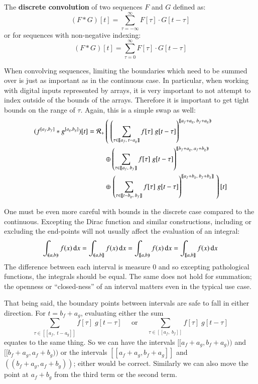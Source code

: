 \begin{definition}
	The \textbf{discrete convolution} of two sequences $F$ and $G$ defined as:
	\begin{equation}
		(F*G)[t] = \sum_{\tau=-\infty}^\infty F[\tau] \cdot G[t-\tau]
	\end{equation}
	or for sequences with non-negative indexing:
	\begin{equation}
		(F*G)[t] = \sum_{\tau=0}^\infty F[\tau] \cdot G[t-\tau]
	\end{equation}
\end{definition}

When convolving sequences, limiting the boundaries which need to be summed over is just as important as in the
continuous case.
In particular, when working with digital inputs represented by arrays, it is very important to not attempt to index outside of
the bounds of the arrays.
Therefore it is important to get tight bounds on the range of $\tau$.
Again, this is a simple swap as well:
\begin{align}
	(f^{[a_f,b_f]} * g^{[a_g, b_g]})[t] = 
		\R[+] &\left( \; \left( 
			\sum_{\tau \in [\![a_f,\;t-a_g]\!]} f[\tau] \; g[t-\tau] \right)^{[\![a_f+a_g,\; b_f+a_g)\!)} 
				\right. \notag \\ &\oplus \left( 
			\sum_{\tau \in [\![a_f,\;b_f]\!]} f[\tau] \; g[t-\tau] \right)^{[\![b_f+a_g,\; a_f+b_g)\!)} 
				\notag \\ &\oplus \left. \left( 
			\sum_{\tau \in [\![t-b_g,\;b_f]\!]} f[\tau] \; g[t-\tau] \right)^{[\![a_f+b_g,\; b_f+b_g]\!]} 
				\; \right)[t]
\end{align}

One must be even more careful with bounds in the discrete case compared to the continuous.
Excepting the Dirac function and similar constructions, including or excluding the end-points will not usually affect the
 evaluation of an integral:
\begin{equation*}
	\int_{(\!(a,b)\!)} f(x) \diff x 
	= \int_{(\!(a,b]\!]} f(x) \diff x 
	= \int_{[\![a,b)\!)} f(x) \diff x 
	= \int_{[\![a,b]\!]} f(x) \diff x
\end{equation*}
The difference between each interval is measure 0 and so excepting pathological functions, the integrals should be equal.
The same does not hold for summation; the openness or ``closed-ness'' of an interval matters even in the typical use case.


That being said, the boundary points between intervals are safe to fall in either direction.
For $t=b_f+a_g$, evaluating either the sum
\begin{equation*}
	\sum_{\tau \in [\![a_f,\;t-a_g]\!]} f[\tau] \; g[t-\tau] 
	\;\;\;\;\; \text{or} \;\;\;\;\; 
	\sum_{\tau \in [\![a_f,\;b_f]\!]} f[\tau] \; g[t-\tau]
\end{equation*}
equates to the same thing.
So we can have the intervals $[\![a_f+a_g, b_f+a_g)\!)$ and $[\![b_f+a_g,a_f+b_g)\!)$ or the intervals 
$[\![a_f+a_g, b_f+a_g]\!]$ and $(\!(b_f+a_g,a_f+b_g)\!)$; either would be correct.
Similarly we can also move the point at $a_f+b_g$ from the third term or the second term.


